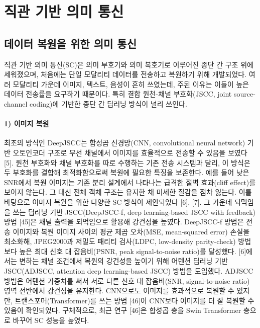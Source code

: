 
\section{직관 기반 의미 통신}

\subsection{데이터 복원을 위한 의미 통신}

직관 기반 의미 통신(SC)은 의미 부호기와 의미 복호기로 이루어진 종단 간 구조 위에 세워졌으며, 처음에는 단일 모달리티 데이터를 전송하고 복원하기 위해 개발되었다.
여러 모달리티 가운데 이미지, 텍스트, 음성이 흔히 쓰였는데, 주된 이유는 이들이 높은 데이터 전송률을 요구하기 때문이다.
특히 결합 원천-채널 부호화(JSCC, joint source-channel coding)에 기반한 종단 간 딥러닝 방식이 널리 쓰인다.

\paragraph{1) 이미지 복원}
최초의 방식인 DeepJSCC는 합성곱 신경망(CNN, convolutional neural network) 기반 오토인코더 구조로 무선 채널에서 이미지를 효율적으로 전송할 수 있음을 보였다 [5].
원천 부호화와 채널 부호화를 따로 수행하는 기존 전송 시스템과 달리, 이 방식은 두 부호화를 결합해 최적화함으로써 복원에 필요한 특징을 보존한다.
예를 들어 낮은 SNR에서 복원 이미지는 기존 분리 설계에서 나타나는 급격한 절벽 효과(cliff effect)를 보이지 않는다. 그 대신 전체 객체 구조는 유지한 채 미세한 질감을 점차 잃는다.
이를 바탕으로 이미지 복원을 위한 다양한 SC 방식이 제안되었다 [6], [7].
그 가운데 되먹임을 쓰는 딥러닝 기반 JSCC(DeepJSCC-f, deep learning-based JSCC with feedback) 방법 [45]은 채널 출력을 되먹임으로 활용해 강건성을 높였다.
DeepJSCC-f 방법은 전송 이미지와 복원 이미지 사이의 평균 제곱 오차(MSE, mean-squared error) 손실을 최소화해, JPEG2000과 저밀도 패리티 검사(LDPC, low-density parity-check) 방법보다 높은 최대 신호 대 잡음비(PSNR, peak signal-to-noise ratio)를 달성했다.
[6]에서는 변하는 채널 조건에서 복원의 강건성을 높이기 위해 어텐션 딥러닝 기반 JSCC(ADJSCC, attention deep learning-based JSCC) 방법을 도입했다.
ADJSCC 방법은 어텐션 가중치를 써서 서로 다른 신호 대 잡음비(SNR, signal-to-noise ratio) 영역 전반에서 강건성을 유지한다.
CNN으로도 이미지를 효과적으로 복원할 수 있지만, 트랜스포머(Transformer)를 쓰는 방법 [46]이 CNN보다 이미지를 더 잘 복원할 수 있음이 확인되었다.
구체적으로, 최근 연구 [46]은 합성곱 층을 Swin Transformer 층으로 바꾸어 SC 성능을 높였다.

